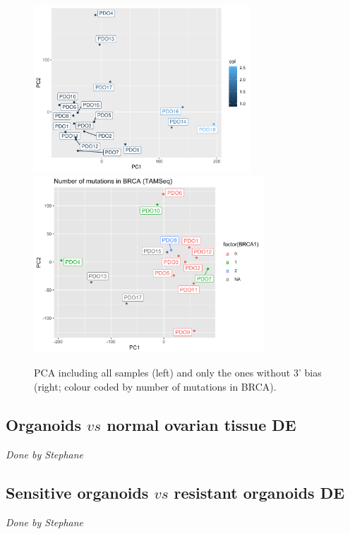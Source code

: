 \documentclass{article}
\begin{document}
\begin{figure}[h]
\centering
\includegraphics[width=3.2in]{../../RNASeq_DE_resistant_sensitive/figures/PCA_RNASeq/3primebias_PCA_counts.pdf}
\includegraphics[width=3.4in]{../../RNASeq_DE_resistant_sensitive/figures/PCA_RNASeq/PCA_counts_subset_BRCA_TAMSeq.png}
\caption{PCA including all samples (left) and only the ones without 3' bias (right; colour coded by number of mutations in BRCA).}
\end{figure}

\subsection{Organoids $vs$ normal ovarian tissue DE}

\begin{center} \emph{Done by Stephane} \end{center}

\subsection{Sensitive organoids $vs$ resistant organoids DE}
\begin{center} \emph{Done by Stephane} \end{center}
\end{document}
